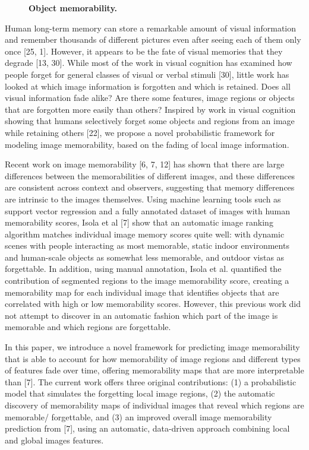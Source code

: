 \begin{figure}[t]
\centering
{}
\vspace{-3mm}\caption{\footnotesize\textbf{Object memorability.}}\label{fig:introPhoto}
\end{figure}


Human long-term memory can store a remarkable amount of visual information and remember thousands of different pictures even after seeing each of them only once [25, 1]. However, it appears to be the fate of visual memories that they degrade [13, 30]. While most of the work in visual cognition has examined how people forget for general classes of visual or verbal stimuli [30], little work has looked at which image information is forgotten and which is retained. Does all visual information fade alike? Are there some features, image regions or objects that are forgotten more easily than others? Inspired by work in visual cognition showing that humans selectively forget some objects and regions from an image while retaining others [22], we propose a novel probabilistic framework for modeling image memorability, based on the fading of local image information.

Recent work on image memorability [6, 7, 12] has shown that there are large differences between the memorabilities of different images, and these differences are consistent across context and observers, suggesting that memory differences are intrinsic to the images themselves. Using machine learning tools such as support vector regression and a fully annotated dataset of images with human memorability scores, Isola et al [7] show that an automatic image ranking algorithm matches individual image memory scores quite well: with dynamic scenes with people interacting as most memorable, static indoor environments and human-scale objects as somewhat less memorable, and outdoor vistas as forgettable. In addition, using manual annotation, Isola et al. quantified the contribution of segmented regions to the image memorability score, creating a memorability map for each individual image that identifies objects that are correlated with high or low memorability scores. However, this previous work did not attempt to discover in an automatic fashion which part of the
image is memorable and which regions are forgettable.

In this paper, we introduce a novel framework for predicting image memorability that is able to
account for how memorability of image regions and different types of features fade over time, offering memorability maps that are more interpretable than [7]. The current work offers three original contributions: (1) a probabilistic model that simulates the forgetting local image regions, (2) the automatic discovery of memorability maps of individual images that reveal which regions are memorable/ forgettable, and (3) an improved overall image memorability prediction from [7], using an automatic, data-driven approach combining local and global images features. 